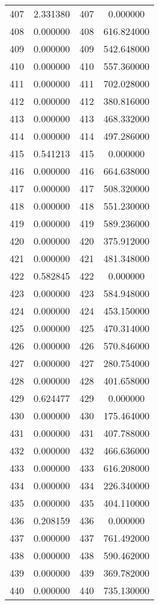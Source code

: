 \documentclass[12pt]{article}
\begin{document}
\begin{longtable}{@{}cccc@{}}
407 & 2.331380 & 407 & 0.000000 \\
408 & 0.000000 & 408 & 616.824000 \\
409 & 0.000000 & 409 & 542.648000 \\
410 & 0.000000 & 410 & 557.360000 \\
411 & 0.000000 & 411 & 702.028000 \\
412 & 0.000000 & 412 & 380.816000 \\
413 & 0.000000 & 413 & 468.332000 \\
414 & 0.000000 & 414 & 497.286000 \\
415 & 0.541213 & 415 & 0.000000 \\
416 & 0.000000 & 416 & 664.638000 \\
417 & 0.000000 & 417 & 508.320000 \\
418 & 0.000000 & 418 & 551.230000 \\
419 & 0.000000 & 419 & 589.236000 \\
420 & 0.000000 & 420 & 375.912000 \\
421 & 0.000000 & 421 & 481.348000 \\
422 & 0.582845 & 422 & 0.000000 \\
423 & 0.000000 & 423 & 584.948000 \\
424 & 0.000000 & 424 & 453.150000 \\
425 & 0.000000 & 425 & 470.314000 \\
426 & 0.000000 & 426 & 570.846000 \\
427 & 0.000000 & 427 & 280.754000 \\
428 & 0.000000 & 428 & 401.658000 \\
429 & 0.624477 & 429 & 0.000000 \\
430 & 0.000000 & 430 & 175.464000 \\
431 & 0.000000 & 431 & 407.788000 \\
432 & 0.000000 & 432 & 466.636000 \\
433 & 0.000000 & 433 & 616.208000 \\
434 & 0.000000 & 434 & 226.340000 \\
435 & 0.000000 & 435 & 404.110000 \\
436 & 0.208159 & 436 & 0.000000 \\
437 & 0.000000 & 437 & 761.492000 \\
438 & 0.000000 & 438 & 590.462000 \\
439 & 0.000000 & 439 & 369.782000 \\
440 & 0.000000 & 440 & 735.130000 \\

\end{longtable}
\end{document}
